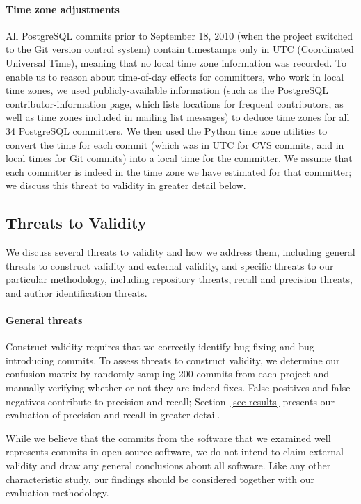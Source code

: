 \paragraph{Time zone adjustments}

All PostgreSQL commits prior to September 18, 2010 (when the project switched to
the Git version control system) contain timestamps only in UTC (Coordinated
Universal Time), meaning that no local time zone information was recorded. To
enable us to reason about time-of-day effects for committers, who work in local
time zones, we used publicly-available information (such as the PostgreSQL
contributor-information page, which lists locations for frequent contributors,
as well as time zones included in mailing list messages) to deduce time zones
for all 34 PostgreSQL committers. We then used the Python time zone utilities to
convert the time for each commit (which was in UTC for CVS commits, and in local
times for Git commits) into a local time for the committer. We assume that each
committer is indeed in the time zone we have estimated for that committer; we
discuss this threat to validity in greater detail below.

\subsection{Threats to Validity}

We discuss several threats to validity and how we address them, including
general threats to construct validity and external validity, and specific
threats to our particular methodology, including repository threats, recall and
precision threats, and author identification threats.

\paragraph{General threats}

Construct validity requires that we correctly identify bug-fixing and
bug-introducing commits. To assess threats to construct validity, we determine
our confusion matrix by randomly sampling 200 commits from each project and
manually verifying whether or not they are indeed fixes. False positives and
false negatives contribute to precision and recall; Section~\ref{sec-results}
presents our evaluation of precision and recall in greater detail.

While we believe that the commits from the software that we examined well
represents commits in open source software, we do not intend to claim external
validity and draw any general conclusions about all software.  Like any other
characteristic study, our findings should be considered together with our
evaluation methodology.

